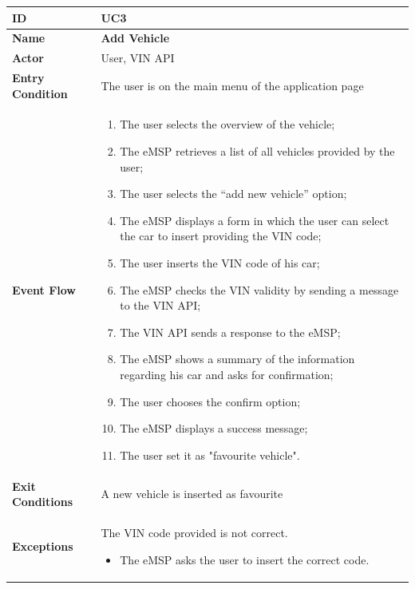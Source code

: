 \documentclass{Configuration_Files/PoliMi3i_thesis}
\begin{document}
\begin{table}[H]
    \begin{xltabular}{\textwidth}{| >{}l | X |}
    \hline
    \textbf{ID} & \textbf{UC3}\T\B\\
    \hline
    \textbf{Name} & \textbf{Add Vehicle}\T\B\\
    \hline \hline
    \textbf{Actor} & User, VIN API\T\B \\
    \hline
    \textbf{Entry Condition} & The user is on the main menu of the application page\T\B\\
    \hline
    \textbf{Event Flow} & 
        \begin{enumerate}
        \item The user selects the overview of the vehicle;
        \item The eMSP retrieves a list of all vehicles provided by the user;
        \item The user selects the “add new vehicle” option;
        \item The eMSP displays a form in which the user can select the car to insert providing the VIN  code;
        \item The user inserts the VIN code of his car;
        \item The eMSP checks the VIN validity by sending a message to the VIN API;
        \item The VIN API sends a response to the eMSP;
        \item The eMSP shows a summary of the information regarding his car and asks for confirmation;
        \item The user chooses the confirm option;
        \item The eMSP displays a success message;
        \item The user set it as "favourite vehicle".
        \end{enumerate}\B\\
    \hline
    \textbf{Exit Conditions} & A new vehicle is inserted as favourite\B\\
    \hline
    \textbf{Exceptions} & 
        The VIN code provided is not correct.
        \begin{itemize}
            \item The eMSP asks the user to insert the correct code.
        \end{itemize}\B\\
    \hline
    \end{xltabular}
\end{table}
\end{document}
